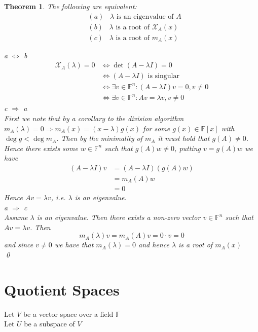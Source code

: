 \documentclass[11pt, a4paper]{report}
\makeatletter
\numberwithin{equation}{section}
\renewcommand{\chi}{\mathcal{X}}
\newcommand{\F}{\mathbb{F}}
\numberwithin{equation}{subsection}
\theoremstyle{plain}
\newtheorem{thm}{Theorem}[chapter] %
\theoremstyle{definition}
\theoremstyle{remark}
\newtheorem*{prf}{Proof}
\renewenvironment{prf}[1][\proofname]{\par
  \vspace{-\topsep}%
  \normalfont
  \topsep0pt \partopsep0pt %
  \trivlist
  \item[\hskip\labelsep
        \itshape
    #1\@addpunct{.}]\ignorespaces
}{%
  \popQED\endtrivlist\@endpefalse
  \addvspace{6pt plus 6pt} %
}
\newcommand{\pr}[1]{\begin{adjustwidth}{1cm}{} \begin{prf} #1 \end{prf} \end{adjustwidth}}
\makeatother
\begin{document}
\begin{thm} The following are equivalent: 
\begin{align*}
&(a) \;\;\; \lambda \text{ is an eigenvalue of } A \\
&(b) \;\;\; \lambda \text{ is a root of } \chi_A(x) \\
&(c) \;\;\; \lambda \text{ is a root of } m_A(x)
\end{align*}
\pr{ a $\iff$ b
\begin{align*}
\chi_A(\lambda) = 0 	&\iff \det(A - \lambda I) = 0\\
						&\iff \text{$(A-\lambda I)$ is singular}\\
						&\iff \exists v \in \F^n : (A - \lambda I)v = 0, v \neq 0\\
						&\iff \exists v \in \F^n : Av = \lambda v, v \neq 0
\end{align*}
c $\Rightarrow$ a\\
First we note that by a corollary to the division algorithm $m_A(\lambda) = 0 \Rightarrow m_A(x) = (x - \lambda) g(x)$ for some $g(x) \in \F[x]$ with $\deg g < \deg m_A$. Then by the minimality of $m_A$ it must hold that $g(A) \neq 0$. Hence there exists some $w \in \F^n$ such that $g(A) w \neq 0$, putting $v = g(A)w$ we have
\begin{align*}
(A - \lambda I)v 	&= (A - \lambda I)(g(A) w)\\
					&= m_A(A) w\\
					&= 0
\end{align*}
Hence $Av = \lambda v$, i.e. $\lambda$ is an eigenvalue.\\
a $\Rightarrow$ c\\
Assume $\lambda$ is an eigenvalue. Then there exists a non-zero vector $v \in \F^n$ such that $Av = \lambda v$. Then
$$m_A(\lambda)v = m_A(A) v = 0 \cdot v = 0$$ and since $v \neq 0$ we have that $m_A(\lambda) = 0$ and hence $\lambda$ is a root of $m_A(x)$\\ \qed
}
\end{thm}

\chapter{Quotient Spaces}
Let $V$ be a vector space over a field $\F$\\
Let $U$ be a subspace of $V$
\end{document}
